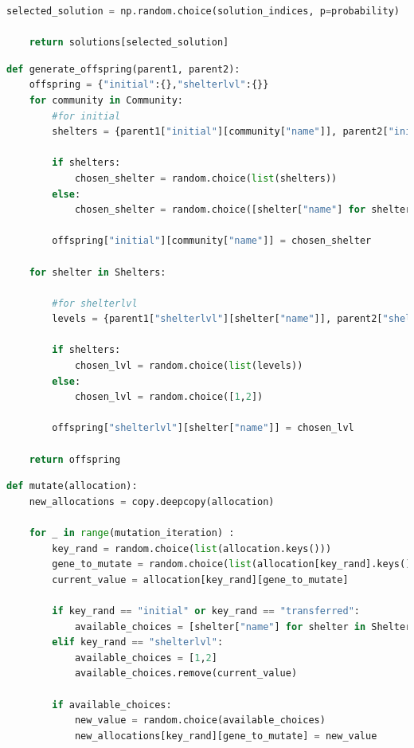 \begin{appendices}
\begin{centerappendixtitle}
\begin{lstlisting}[language=Python,caption={Genetic Algorithm - Selection}, label={selectionCode}]
	selected_solution = np.random.choice(solution_indices, p=probability)
	
	return solutions[selected_solution]
\end{lstlisting}

\begin{lstlisting}[language=Python,caption={Genetic Algorithm - Crossover}, label={crossoverCode}]
def generate_offspring(parent1, parent2):
    offspring = {"initial":{},"shelterlvl":{}}
    for community in Community:
        #for initial
        shelters = {parent1["initial"][community["name"]], parent2["initial"][community["name"]]} 
        
        if shelters:
            chosen_shelter = random.choice(list(shelters))
        else:
            chosen_shelter = random.choice([shelter["name"] for shelter in Shelters])

        offspring["initial"][community["name"]] = chosen_shelter

    for shelter in Shelters:

        #for shelterlvl
        levels = {parent1["shelterlvl"][shelter["name"]], parent2["shelterlvl"][shelter["name"]]} 
        
        if shelters:
            chosen_lvl = random.choice(list(levels))
        else:
            chosen_lvl = random.choice([1,2])

        offspring["shelterlvl"][shelter["name"]] = chosen_lvl

    return offspring
\end{lstlisting}

\pagebreak
\begin{lstlisting}[language=Python,caption={Genetic Algorithm - Mutation}, label={mutationCode}]
def mutate(allocation):
    new_allocations = copy.deepcopy(allocation)

    for _ in range(mutation_iteration) : 
        key_rand = random.choice(list(allocation.keys()))
        gene_to_mutate = random.choice(list(allocation[key_rand].keys()))
        current_value = allocation[key_rand][gene_to_mutate]
        
        if key_rand == "initial" or key_rand == "transferred":
            available_choices = [shelter["name"] for shelter in Shelters if shelter["name"] != current_value]
        elif key_rand == "shelterlvl":
            available_choices = [1,2]
            available_choices.remove(current_value)

        if available_choices:
            new_value = random.choice(available_choices)
            new_allocations[key_rand][gene_to_mutate] = new_value
            

\end{lstlisting}
\end{centerappendixtitle}
\end{appendices}
